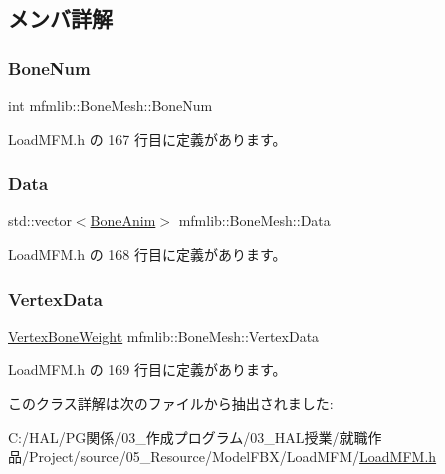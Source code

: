 \subsection{メンバ詳解}
\mbox{\label{classmfmlib_1_1_bone_mesh_a56275d3c9a8cc5ca1026f6498b3bedc3}} 
\subsubsection{\texorpdfstring{Bone\+Num}{BoneNum}}
{\footnotesize\ttfamily int mfmlib\+::\+Bone\+Mesh\+::\+Bone\+Num}



 Load\+M\+F\+M.\+h の 167 行目に定義があります。

\mbox{\label{classmfmlib_1_1_bone_mesh_a3ec6ff3ede0f20ad419500c80ce2e6c1}} 
\subsubsection{\texorpdfstring{Data}{Data}}
{\footnotesize\ttfamily std\+::vector$<$\mbox{\hyperlink{classmfmlib_1_1_bone_anim}{Bone\+Anim}}$>$ mfmlib\+::\+Bone\+Mesh\+::\+Data}



 Load\+M\+F\+M.\+h の 168 行目に定義があります。

\mbox{\label{classmfmlib_1_1_bone_mesh_ab252d2d15dc2e927471943a33b19fbc4}} 
\subsubsection{\texorpdfstring{Vertex\+Data}{VertexData}}
{\footnotesize\ttfamily \mbox{\hyperlink{classmfmlib_1_1_vertex_bone_weight}{Vertex\+Bone\+Weight}} mfmlib\+::\+Bone\+Mesh\+::\+Vertex\+Data}



 Load\+M\+F\+M.\+h の 169 行目に定義があります。



このクラス詳解は次のファイルから抽出されました\+:\begin{DoxyCompactItemize}
\item 
C\+:/\+H\+A\+L/\+P\+G関係/03\+\_\+作成プログラム/03\+\_\+\+H\+A\+L授業/就職作品/\+Project/source/05\+\_\+\+Resource/\+Model\+F\+B\+X/\+Load\+M\+F\+M/\mbox{\hyperlink{_load_m_f_m_8h}{Load\+M\+F\+M.\+h}}\end{DoxyCompactItemize}
